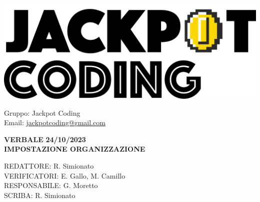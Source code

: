 \documentclass[5pt]{article}
\begin{document}
\begin{minipage}[t]{0.50\textwidth}
    \begin{flushleft}
        \hspace{10pt}
        \includegraphics[scale=0.65]{assets/jackpot-logo.png} 
    \end{flushleft}
\end{minipage}
\hspace{-60pt} %
\begin{flushright}
    \begin{minipage}[t]{0.50\textwidth}
        \begin{flushright}
            Gruppo: {\Large Jackpot Coding}\\
            Email: \href{mailto:jackpotcoding@gmail.com}{jackpotcoding@gmail.com}
        \end{flushright}
    \end{minipage}
\end{flushright}

\vspace{24pt}

\begin{center}
    \textbf{\large VERBALE }
    \textbf{\large 24/10/2023} \\
    \textbf{\Large IMPOSTAZIONE ORGANIZZAZIONE}
\end{center}

\vspace{13pt}

\begin{flushleft}
    \begin{spacing}{1.5}
        REDATTORE: R. Simionato\\%
        VERIFICATORI: E. Gallo, M. Camillo \\
        RESPONSABILE: G. Moretto\\%
        \vspace{7pt}
        SCRIBA: R. Simionato\\%
    \end{spacing}
\end{flushleft}
\end{document}
